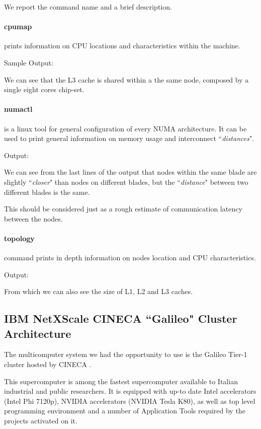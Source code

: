 \documentclass[a4paper,12pt]{article}
\begin{document}
We report the command name and a brief description.

\paragraph{cpumap} prints information on CPU locations and characteristics within the machine.

Sample Output: 


We can see that the L3 cache is shared within a the same node, composed by a single eight cores chip-set.


\paragraph{numactl} is a linux tool for general configuration of every NUMA architecture.
It can be used to print general information on memory usage and interconnect ``\textit{distances}".

Output:




We can see from the last lines of the output that nodes within the same blade are slightly ``\textit{closer}" than nodes on different blades, but the ``\textit{distance}" between two different blades is the same.

This should be considered just as a rough estimate of communication latency between the nodes.

\paragraph{topology} command prints in depth information on nodes location and CPU characteristics.

Output:

From which we can also see the size of L1, L2 and L3 caches.


\subsection{IBM NetXScale CINECA ``Galileo" Cluster Architecture}\label{galileoarch:sec}

The multicomputer system we had the opportunity to use is the Galileo Tier-1 cluster hosted by CINECA \cite{Galileo}.

This supercomputer is among  the fastest supercomputer available to Italian industrial and public researchers. It is equipped with up-to date Intel accelerators (Intel Phi 7120p), NVIDIA accelerators (NVIDIA Tesla K80), as well as top level programming environment and a number of Application Tools required by the projects activated on it.
\end{document}
